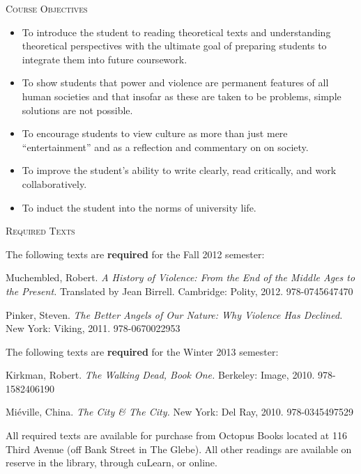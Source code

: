 \documentclass[12pt]{article}
\begin{document}
\vspace{.125in}

{\Large \textsc{Course Objectives}}

\begin{itemize}
\item To introduce the student to reading theoretical texts and understanding theoretical perspectives with the ultimate goal of preparing students to integrate them into future coursework.
\item To show students that power and violence are permanent features of all human societies and that insofar as these are taken to be problems, simple solutions are not possible.
\item To encourage students to view culture as more than just mere ``entertainment'' and as a reflection and commentary on on society.
\item To improve the student's ability to write clearly, read critically, and work collaboratively.
\item To induct the student into the norms of university life.
\end{itemize}

{\Large \textsc{Required Texts}}

The following texts are \textbf{required} for the Fall 2012 semester:

\begin{hangparas}{.5in}{1}

Muchembled, Robert. \textit{A History of Violence: From the End of the Middle Ages to the Present.} Translated by Jean Birrell. Cambridge: Polity, 2012. 978-0745647470

Pinker, Steven. \textit{The Better Angels of Our Nature: Why Violence Has Declined.} New York: Viking, 2011. 978-0670022953

The following texts are \textbf{required} for the Winter 2013 semester:

Kirkman, Robert. \textit{The Walking Dead, Book One.} Berkeley: Image, 2010. 978-1582406190

Mi\'eville, China. \textit{The City \& The City.} New York: Del Ray, 2010. 978-0345497529
\end{hangparas}

All required texts are available for purchase from Octopus Books located at 116 Third Avenue (off Bank Street in The Glebe). All other readings are available on reserve in the library, through cuLearn, or online.

\vspace{.125in}
\end{document}

